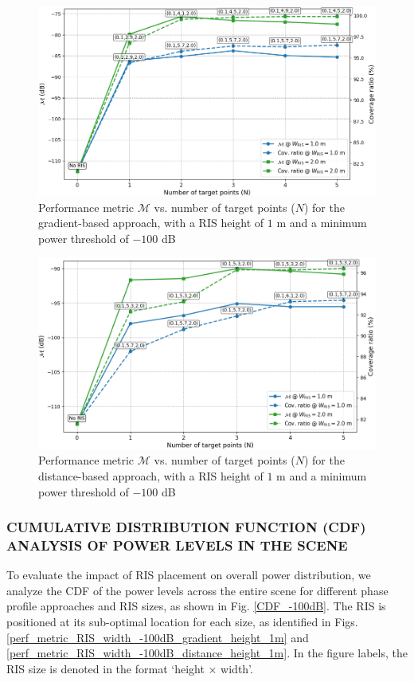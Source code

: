 \documentclass{IEEEoj}
\begin{document}
\begin{figure}
	\centering
	\includegraphics[width=\linewidth]{Sim_Results/performance_and_coverage_vs_N_Gradient.png}
	\caption{Performance metric $\mathcal{M}$ vs. number of target points ($N$) for the gradient-based approach, with a RIS height of $1$ m and a minimum power threshold of $-100$ dB}
	\label{performance_and_coverage_vs_N_Gradient}
\end{figure}

\begin{figure}
	\centering
	\includegraphics[width=\linewidth]{Sim_Results/performance_and_coverage_vs_N_Distance.png}
	\caption{Performance metric $\mathcal{M}$ vs. number of target points ($N$) for the distance-based approach, with a RIS height of $1$ m and a minimum power threshold of $-100$ dB}
	\label{performance_and_coverage_vs_N_Distance}
\end{figure}

\subsubsection{CUMULATIVE DISTRIBUTION FUNCTION (CDF) ANALYSIS OF POWER LEVELS IN THE SCENE}
To evaluate the impact of RIS placement on overall power distribution, we analyze the CDF of the power levels across the entire scene for different phase profile approaches and RIS sizes, as shown in Fig. \ref{CDF_-100dB}. The RIS is positioned at its sub-optimal location for each size, as identified in Figs. \ref{perf_metric_RIS_width_-100dB_gradient_height_1m} and \ref{perf_metric_RIS_width_-100dB_distance_height_1m}. In the figure labels, the RIS size is denoted in the format `height × width'.
\end{document}
